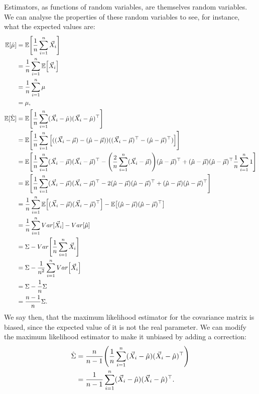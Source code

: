 \documentclass[headings=optiontoheadandtoc,listof=totoc,parskip=full]{scrartcl}
\begin{document}
Estimators, as functions of random variables, are themselves random variables. We can analyse the properties of these random variables to see, for instance, what the expected values are:
\begin{align*}
	\mathbb{E}[\hat \mu] &= \mathbb{E} \qty[\frac{1}{n} \sum_{i = 1}^n \vec X_i]\\
		&= \frac{1}{n}\sum_{i = 1}^n \mathbb{E} \qty[\vec X_i]\\
		&= \frac{1}{n}\sum_{i = 1}^n \mu\\
		&= \mu,\\
	\mathbb{E}[\hat \Sigma] &= \mathbb{E} \qty[\frac{1}{n} \sum_{i = 1}^n (\vec X_i - \hat \mu)(\vec X_i - \hat \mu)^\top]\\
		&= \mathbb{E} \qty[\frac{1}{n} \sum_{i = 1}^n \qty[((\vec X_i - \vec \mu) - (\hat \mu - \vec \mu))((\vec X_i - \vec \mu)^\top - (\hat \mu - \vec \mu)^\top)]]\\
		&= \mathbb{E} \qty[\frac{1}{n} \sum_{i = 1}^n(\vec X_i - \vec \mu)(\vec X_i - \vec \mu)^\top - \qty(\frac{2}{n} \sum_{i = 1}^n(\vec X_i - \vec \mu))(\hat \mu - \vec \mu)^\top + (\hat \mu - \vec \mu)(\hat \mu - \vec \mu)^\top \frac{1}{n} \sum_{i = 1}^n 1]\\
		&= \mathbb{E} \qty[\frac{1}{n} \sum_{i = 1}^n(\vec X_i - \vec \mu)(\vec X_i - \vec \mu)^\top - 2(\hat \mu - \vec \mu)(\hat \mu - \vec \mu)^\top + (\hat \mu - \vec \mu)(\hat \mu - \vec \mu)^\top]\\
		&= \frac{1}{n} \sum_{i = 1}^n\mathbb{E} \qty[(\vec X_i - \vec \mu)(\vec X_i - \vec \mu)^\top] - \mathbb{E} \qty[(\hat \mu - \vec \mu)(\hat \mu - \vec \mu)^\top]\\
		&= \frac{1}{n} \sum_{i = 1}^n Var[\vec X_i] - Var[\hat \mu]\\
		&= \Sigma - Var \qty[\frac{1}{n} \sum_{i = 1}^n \vec X_i]\\
		&= \Sigma - \frac{1}{n^2} \sum_{i = 1}^n Var \qty[\vec X_i]\\
		&= \Sigma - \frac{1}{n} \Sigma\\
		&= \frac{n - 1}{n} \Sigma.
\end{align*}
We say then, that the maximum likelihood estimator for the covariance matrix is biased, since the expected value of it is not the real parameter. We can modify the maximum likelihood estimator to make it unbiased by adding a correction:
\begin{align*}
	\hat \Sigma &= \frac{n}{n - 1} \qty(\frac{1}{n} \sum_{i = 1}^n (\vec X_i - \hat \mu)(\vec X_i - \hat \mu)^\top)\\
		&= \frac{1}{n - 1} \sum_{i = 1}^n (\vec X_i - \hat \mu)(\vec X_i - \hat \mu)^\top.
\end{align*}
\end{document}
